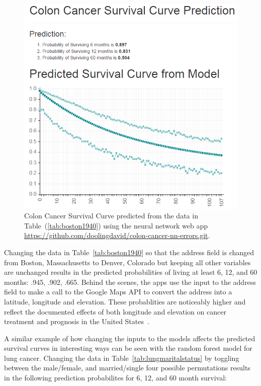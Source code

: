 \documentclass[10pt,letterpaper]{article}
\begin{document}
\begin{figure}[!ht]
  \centering
    \includegraphics[scale=.8]{boston1940}
\caption{\label{fig:boston1940} Colon Cancer Survival Curve predicted from the data in 
Table~(\ref{tab:boston1940}) using the neural network web app \url{https://github.com/doolingdavid/colon-cancer-nn-errors.git}.}
\end{figure}

Changing the data in Table~\ref{tab:boston1940} so that the address field is changed from Boston, Massachusetts to Denver, Colorado but keeping all other variables are unchanged results in the predicted probabilities of living at least 6, 12, and 60 months: .945, .902, .665. 
Behind the scenes, the apps use the input to the address field to make a call to the Google Maps API to convert the address into a latitude, longitude and elevation.
These probablities are noticeably higher and reflect the documented effects of both longitude and elevation on cancer treatment and prognosis in the United States~\cite{kob4}.

A similar example of how changing the inputs to the models affects the predicted survival curves in interesting ways can be seen with the random forest model for lung cancer. Changing the data in Table~\ref{tab:lungmaritalstatus} by toggling between the male/female, and married/single four possible permutations results in the following prediction probabilites for 6, 12, and 60 month survival:
\end{document}

